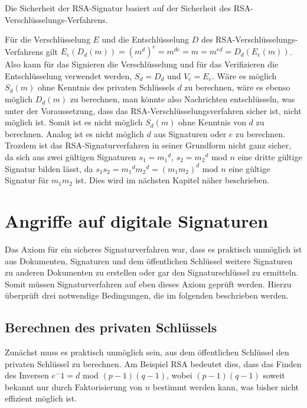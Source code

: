 \documentclass[a4paper,12pt,oneside]{scrreprt}
\begin{document}
Die Sicherheit der RSA-Signatur basiert auf der Sicherheit des RSA-Verschlüsselungs-Verfahrens. 

Für die Verschlüsselung $E$ und die Entschlüsselung $D$ des RSA-Verschlüsselungs-Verfahrens gilt $E_e(D_d(m)) = (m^d)^e = m^{de} = m = m^{ed} = D_d(E_e(m))$. Also kann für das Signieren die Verschlüsselung und für das Verifizieren die Entschlüsselung verwendet werden, $S_d = D_d$ und $V_e = E_e$. Wäre es möglich $S_d(m)$ ohne Kenntnis des privaten Schlüssels $d$ zu berechnen, wäre es ebenso möglich $D_d(m)$ zu berechnen, man könnte also Nachrichten entschlüsseln, was unter der Voraussetzung, dass das RSA-Verschlüsselungsverfahren sicher ist, nicht möglich ist. Somit ist es nicht möglich $S_d(m)$ ohne Kenntnis von $d$ zu berechnen. Analog ist es nicht möglich $d$ aus Signaturen oder $e$ zu berechnen. Trozdem ist das RSA-Signaturverfahren in seiner Grundform nicht ganz sicher, da sich aus zwei gültigen Signaturen $s_1 = {m_1}^d$, $s_2 = {m_2}^d$ mod $n$ eine dritte gültige Signatur bilden lässt, da $s_1 s_2 = {m_1}^d {m_2}^d = (m_1 m_2)^d$ mod $n$ eine gültige Signatur für $m_1 m_2$ ist. Dies wird im nächsten Kapitel näher beschrieben. 






\chapter{Angriffe auf digitale Signaturen}

Das Axiom für ein sicheres Signaturverfahren war, dass es praktisch unmöglich ist aus Dokumenten, Signaturen und dem öffentlichen Schlüssel weitere Signaturen zu anderen Dokumenten zu erstellen oder gar den Signaturschlüssel zu ermitteln. Somit müssen Signaturverfahren auf eben dieses Axiom geprüft werden. Hierzu überprüft \cite{buchmann2010einfa1} drei notwendige Bedingungen, die im folgenden beschrieben werden. 

\section{Berechnen des privaten Schlüssels}

Zunächst muss es praktisch unmöglich sein, aus dem öffentlichen Schlüssel den privaten Schlüssel zu berechnen. Am Beispiel RSA bedeutet dies, dass das Finden des Inversen $e^-1 = d$ mod $(p-1)(q-1)$, wobei $(p-1)(q-1)$ soweit bekannt nur durch Faktorisierung von $n$ bestimmt werden kann, was bisher nicht effizient möglich ist. 
\end{document}
